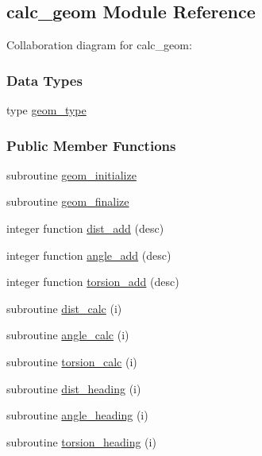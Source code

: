 \hypertarget{classcalc__geom}{\subsection{calc\-\_\-geom Module Reference}
\label{classcalc__geom}
}


Collaboration diagram for calc\-\_\-geom\-:
\subsubsection*{Data Types}
\begin{DoxyCompactItemize}
\item 
type \hyperlink{structcalc__geom_1_1geom__type}{geom\-\_\-type}
\end{DoxyCompactItemize}
\subsubsection*{Public Member Functions}
\begin{DoxyCompactItemize}
\item 
subroutine \hyperlink{classcalc__geom_ae3a4d06138ec68ee527ca3722472b614}{geom\-\_\-initialize}
\item 
subroutine \hyperlink{classcalc__geom_a504fbdb44b77e22603bf37d6040cb5a0}{geom\-\_\-finalize}
\item 
integer function \hyperlink{classcalc__geom_a348c8fca0f213a2b56b1dcb981070709}{dist\-\_\-add} (desc)
\item 
integer function \hyperlink{classcalc__geom_ae9aa6ab09d34aced5ae66c206327cd74}{angle\-\_\-add} (desc)
\item 
integer function \hyperlink{classcalc__geom_ad2c40be3e2901a0ac616ff333cce9efd}{torsion\-\_\-add} (desc)
\item 
subroutine \hyperlink{classcalc__geom_a944ba8085f76be268d1f09a8d26c8afd}{dist\-\_\-calc} (i)
\item 
subroutine \hyperlink{classcalc__geom_ac7a76181631ae1bfed15607f66009fe1}{angle\-\_\-calc} (i)
\item 
subroutine \hyperlink{classcalc__geom_a7b26a568cc21cfccd5c6bc8c421c31b7}{torsion\-\_\-calc} (i)
\item 
subroutine \hyperlink{classcalc__geom_a1a36de577634902041727339238e94c4}{dist\-\_\-heading} (i)
\item 
subroutine \hyperlink{classcalc__geom_abb7f94251454e88ff6e12ccaf78d9489}{angle\-\_\-heading} (i)
\item 
subroutine \hyperlink{classcalc__geom_a06660b196ea23ef719bddf64da4fa039}{torsion\-\_\-heading} (i)
\end{DoxyCompactItemize}
